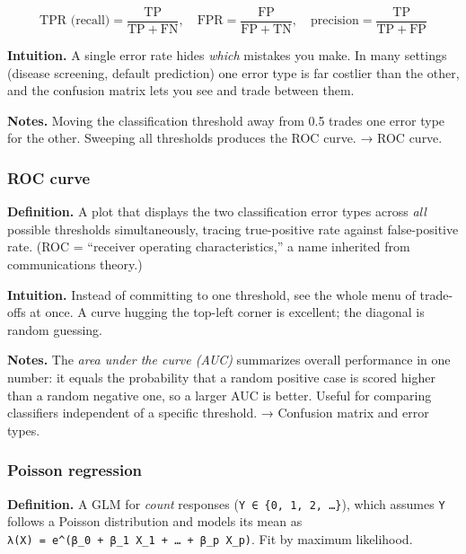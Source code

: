 \documentclass[
  10pt,
  letterpaper,
  onecolumn]{article}
\begin{document}
\begin{equation*}
\text{TPR (recall)}=\frac{\mathrm{TP}}{\mathrm{TP}+\mathrm{FN}},\quad
\text{FPR}=\frac{\mathrm{FP}}{\mathrm{FP}+\mathrm{TN}},\quad
\text{precision}=\frac{\mathrm{TP}}{\mathrm{TP}+\mathrm{FP}}
\end{equation*}

\textbf{Intuition.} A single error rate hides \emph{which} mistakes you
make. In many settings (disease screening, default prediction) one error
type is far costlier than the other, and the confusion matrix lets you
see and trade between them.

\textbf{Notes.} Moving the classification threshold away from 0.5 trades
one error type for the other. Sweeping all thresholds produces the ROC
curve. → ROC curve.

\hypertarget{roc-curve}{%
\subsubsection{ROC curve}\label{roc-curve}}

\textbf{Definition.} A plot that displays the two classification error
types across \emph{all} possible thresholds simultaneously, tracing
true-positive rate against false-positive rate. (ROC = ``receiver
operating characteristics,'' a name inherited from communications
theory.)

\textbf{Intuition.} Instead of committing to one threshold, see the
whole menu of trade-offs at once. A curve hugging the top-left corner is
excellent; the diagonal is random guessing.

\textbf{Notes.} The \emph{area under the curve (AUC)} summarizes overall
performance in one number: it equals the probability that a random
positive case is scored higher than a random negative one, so a larger
AUC is better. Useful for comparing classifiers independent of a
specific threshold. → Confusion matrix and error types.

\hypertarget{poisson-regression}{%
\subsubsection{Poisson regression}\label{poisson-regression}}

\textbf{Definition.} A GLM for \emph{count} responses
(\texttt{Y\ ∈\ \{0,\ 1,\ 2,\ …\}}), which assumes \texttt{Y} follows a
Poisson distribution and models its mean as
\texttt{λ(X)\ =\ e\^{}(β\_0\ +\ β\_1\ X\_1\ +\ …\ +\ β\_p\ X\_p)}. Fit
by maximum likelihood.
\end{document}

